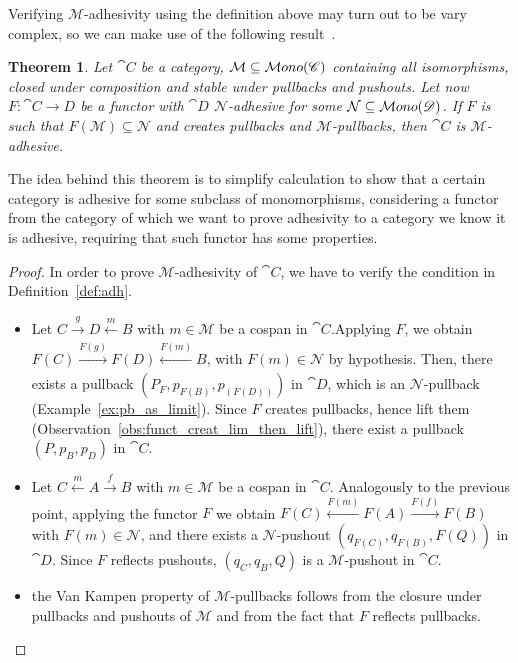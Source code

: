 \documentclass[a4paper, twoside,openright]{report}
\theoremstyle{plain}
\newtheorem{theorem}{Theorem}[section]
\theoremstyle{definition}
\begin{document}

Verifying $\mathcal M$-adhesivity using the definition above may turn out to be vary complex, so we can make use of the following result~\cite{castelnovo2022newcriterionmathcalmmathcalnadhesivity}. 

\begin{theorem}
    Let $\cat C$ be a category, $\mathcal M \subseteq \mathcal{M}ono(\mathscr{C})$ containing all isomorphisms, closed under composition and stable under pullbacks and pushouts. Let now $F: \cat{C \rightarrow D}$ be a functor with $\cat D$ $\mathcal{N}$-adhesive for some $\mathcal{N} \subseteq \mathcal{M}ono(\mathscr{D})$.
    If $F$ is such that $F(\mathcal{M}) \subseteq \mathcal N$ and creates pullbacks and $\mathcal{M}$-pullbacks, then $\cat C$ is $\mathcal M$-adhesive.
\end{theorem}

The idea behind this theorem is to simplify calculation to show that a certain category is adhesive for some subclass of monomorphisms, considering a functor from the category of which we want to prove adhesivity to a category we know it is adhesive, requiring that such functor has some properties.

\begin{proof}
    In order to prove $\mathcal M$-adhesivity of $\cat C$, we have to verify the condition in Definition~\ref{def:adh}.
    \begin{itemize}
        \item Let $C \xrightarrow[]{g} D \xleftarrow[]{m} B$ with $m \in \mathcal M$ be a cospan in $\cat C$.Applying $F$, we obtain $F(C) \xrightarrow[]{F(g)} F(D) \xleftarrow[]{F(m)} B$, with $F(m) \in \mathcal{N}$ by hypothesis. Then, there exists a pullback $(P_F, p_{F(B)}, p_{(F(D))})$ in $\cat D$, which is an $\mathcal N$-pullback (Example~\ref{ex:pb_as_limit}). Since $F$ creates pullbacks, hence lift them (Observation~\ref{obs:funct_creat_lim_then_lift}), there exist a pullback $(P, p_B, p_D)$ in $\cat C$.
        \item Let $C \xleftarrow{m} A \xrightarrow{f} B$ with $ m \in \mathcal M$ be a cospan in $\cat C$. Analogously to the previous point, applying the functor $F$ we obtain $F(C) \xleftarrow{F(m)} F(A) \xrightarrow{F(f)} F(B)$ with $ F(m) \in \mathcal N$, and there exists a $\mathcal N$-pushout $(q_{F(C)}, q_{F(B)}, F(Q))$ in $\cat D$. Since $F$ reflects pushouts, $(q_C, q_B, Q)$ is a $\mathcal{M}$-pushout in $\cat C$.
        \item the Van Kampen property of $\mathcal M$-pullbacks follows from the closure under pullbacks and pushouts of $\mathcal M$ and from the fact that $F$ reflects pullbacks.
    \end{itemize}
    
\end{proof}
\end{document}
